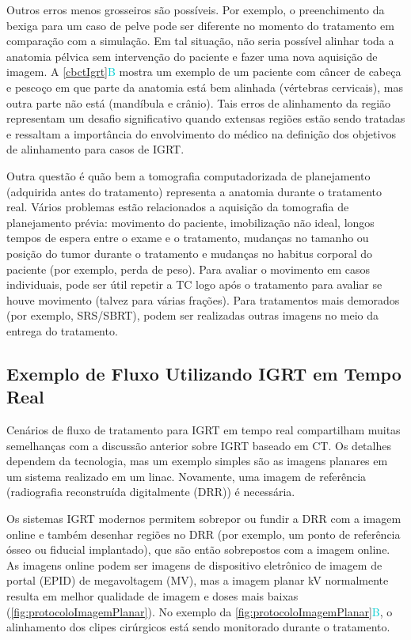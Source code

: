 \documentclass[11pt,a4paper]{article}
\newcounter{exemplo}
\begin{document}
	Outros erros menos grosseiros são possíveis. Por exemplo, o preenchimento da bexiga para um caso de pelve pode ser diferente no momento do tratamento em comparação com a simulação. Em tal situação, não seria possível alinhar toda a anatomia pélvica sem intervenção do paciente e fazer uma nova aquisição de imagem. A \ref{cbctIgrt}\textcolor{DarkTurquoise}{B} mostra um exemplo de um paciente com câncer de cabeça e pescoço em que parte da anatomia está bem alinhada (vértebras cervicais), mas outra parte não está (mandíbula e crânio). Tais erros de alinhamento da região representam um desafio significativo quando extensas regiões estão sendo tratadas e ressaltam a importância do envolvimento do médico na definição dos objetivos de alinhamento para casos de IGRT. 

	Outra questão é quão bem a tomografia computadorizada de planejamento (adquirida antes do tratamento) representa a anatomia durante o tratamento real. Vários problemas estão relacionados a aquisição da tomografia de planejamento prévia: movimento do paciente, imobilização não ideal, longos tempos de espera entre o exame e o tratamento, mudanças no tamanho ou posição do tumor durante o tratamento e mudanças no habitus corporal do paciente (por exemplo, perda de peso). Para avaliar o movimento em casos individuais, pode ser útil repetir a TC logo após o tratamento para avaliar se houve movimento (talvez para várias frações). Para tratamentos mais demorados (por exemplo, SRS/SBRT), podem ser realizadas outras imagens no meio da entrega do tratamento. 

\subsection{Exemplo de Fluxo Utilizando IGRT em Tempo Real}

	Cenários de fluxo de tratamento para IGRT em tempo real compartilham muitas semelhanças com a discussão anterior sobre IGRT baseado em CT. Os detalhes dependem da tecnologia, mas um exemplo simples são as imagens planares em um sistema realizado em um linac. Novamente, uma imagem de referência (radiografia reconstruída digitalmente (DRR)) é necessária. 

	Os sistemas IGRT modernos permitem sobrepor ou fundir a DRR com a imagem online e também desenhar regiões no DRR (por exemplo, um ponto de referência ósseo ou fiducial implantado), que são então sobrepostos com a imagem online. As imagens online podem ser imagens de dispositivo eletrônico de imagem de portal (EPID) de megavoltagem (MV), mas a imagem planar kV normalmente resulta em melhor qualidade de imagem e doses mais baixas (\ref{fig:protocoloImagemPlanar}). No exemplo da \ref{fig:protocoloImagemPlanar}\textcolor{DarkTurquoise}{B}, o alinhamento dos clipes cirúrgicos está sendo monitorado durante o tratamento.
\end{document}
